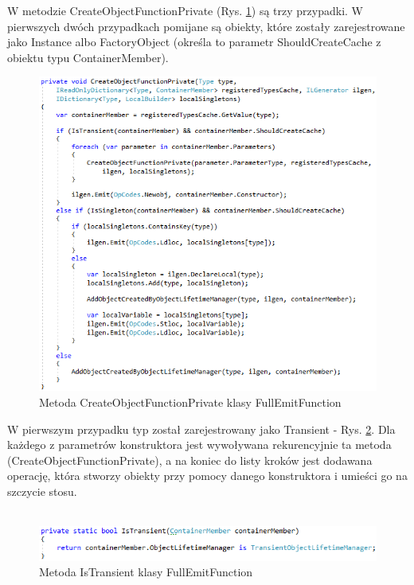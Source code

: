 \documentclass[12pt]{article}
\begin{document}
W metodzie CreateObjectFunctionPrivate (Rys. \ref{fig:FullEmitFunction_CreateObjectFunctionPrivate}) są trzy przypadki. W pierwszych dwóch przypadkach pomijane są obiekty, które zostały zarejestrowane jako Instance albo FactoryObject (określa to parametr ShouldCreateCache z obiektu typu ContainerMember).\\
\begin{figure}[H]
	\begin{center}
  		\includegraphics{FullEmitFunction_CreateObjectFunctionPrivate.png}
  		\caption{Metoda CreateObjectFunctionPrivate klasy FullEmitFunction}
  		\label{fig:FullEmitFunction_CreateObjectFunctionPrivate}
	\end{center}
\end{figure}

W pierwszym przypadku typ został zarejestrowany jako Transient -  Rys. \ref{fig:FullEmitFunction_IsTransient}. Dla każdego z parametrów konstruktora jest wywoływana rekurencyjnie ta metoda (CreateObjectFunctionPrivate), a na koniec do listy kroków jest dodawana operację, która stworzy obiekty przy pomocy danego konstruktora i umieści go na szczycie stosu.\\ \\
\begin{figure}[H]
	\begin{center}
  		\includegraphics{FullEmitFunction_IsTransient.png}
  		\caption{Metoda IsTransient klasy FullEmitFunction}
  		\label{fig:FullEmitFunction_IsTransient}
	\end{center}
\end{figure}
\end{document}

